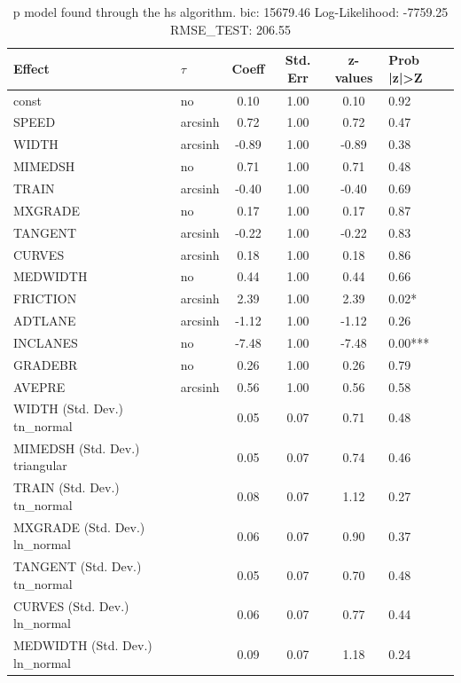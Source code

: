 \begin{table}
	\caption{p model found through the hs algorithm. bic: 15679.46 Log-Likelihood: -7759.25 RMSE_TEST: 206.55}
	\begin{center}
		\begin{tabular}{|l|l|c|c|c|l|}
			\hline
			Effect & $\tau$ & Coeff & Std. Err & z-values & Prob |z|>Z \\
			\hline
			const & no & 0.10 & 1.00 & 0.10 & 0.92 \\
			\hline
			SPEED & arcsinh & 0.72 & 1.00 & 0.72 & 0.47 \\
			\hline
			WIDTH & arcsinh & -0.89 & 1.00 & -0.89 & 0.38 \\
			\hline
			MIMEDSH & no & 0.71 & 1.00 & 0.71 & 0.48 \\
			\hline
			TRAIN & arcsinh & -0.40 & 1.00 & -0.40 & 0.69 \\
			\hline
			MXGRADE & no & 0.17 & 1.00 & 0.17 & 0.87 \\
			\hline
			TANGENT & arcsinh & -0.22 & 1.00 & -0.22 & 0.83 \\
			\hline
			CURVES & arcsinh & 0.18 & 1.00 & 0.18 & 0.86 \\
			\hline
			MEDWIDTH & no & 0.44 & 1.00 & 0.44 & 0.66 \\
			\hline
			FRICTION & arcsinh & 2.39 & 1.00 & 2.39 & 0.02* \\
			\hline
			ADTLANE & arcsinh & -1.12 & 1.00 & -1.12 & 0.26 \\
			\hline
			INCLANES & no & -7.48 & 1.00 & -7.48 & 0.00*** \\
			\hline
			GRADEBR & no & 0.26 & 1.00 & 0.26 & 0.79 \\
			\hline
			AVEPRE & arcsinh & 0.56 & 1.00 & 0.56 & 0.58 \\
			\hline
			WIDTH (Std. Dev.) tn_normal &  & 0.05 & 0.07 & 0.71 & 0.48 \\
			\hline
			MIMEDSH (Std. Dev.) triangular &  & 0.05 & 0.07 & 0.74 & 0.46 \\
			\hline
			TRAIN (Std. Dev.) tn_normal &  & 0.08 & 0.07 & 1.12 & 0.27 \\
			\hline
			MXGRADE (Std. Dev.) ln_normal &  & 0.06 & 0.07 & 0.90 & 0.37 \\
			\hline
			TANGENT (Std. Dev.) tn_normal &  & 0.05 & 0.07 & 0.70 & 0.48 \\
			\hline
			CURVES (Std. Dev.) ln_normal &  & 0.06 & 0.07 & 0.77 & 0.44 \\
			\hline
			MEDWIDTH (Std. Dev.) ln_normal &  & 0.09 & 0.07 & 1.18 & 0.24 \\

\end{tabular}
\end{center}
\end{table}
